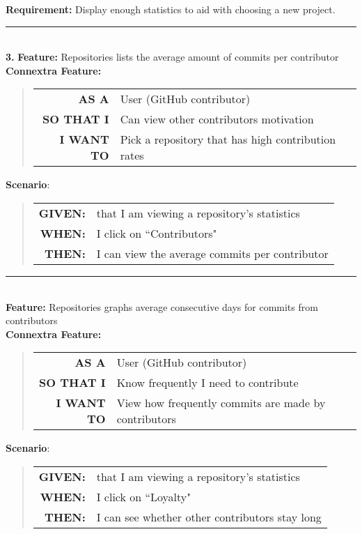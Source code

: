 \documentclass[12pt]{article}
\newcommand{\Requirement}[1] {
   \noindent \textbf{Requirement:} #1
}
\newcommand{\Feature}[1]{ 
   \noindent \textbf{Feature:} #1
}
\newcommand{\CFeature}[4]{
\noindent \textbf{Connextra Feature:}
	\begin{quote}
	\begin{tabular}{rl}
	\textbf{AS A} & #1\\
	\textbf{SO THAT \uppercase{#2}} & #3\\
	\textbf{\uppercase{#2} WANT TO} & #4  
	\end{tabular}
	\end{quote}
}
\newcommand{\GivenSc} {
	\noindent \textbf{GIVEN:}
	}
\newcommand{\WhenSc} {
	\noindent \textbf{WHEN:}
	}
\newcommand{\AndSc} {
	\noindent \textbf{AND:}
	}
\newcommand{\ThenSc} {
	\noindent \textbf{THEN:}
	}
\begin{document}
\begin{framed}
\Requirement{Display enough statistics to aid with choosing a new project.}\\[0.2cm]

\hrule~\\

\noindent  \textbf{3.}\Feature{Repositories lists the average amount of commits per contributor}\\[0.2cm]

\CFeature{User (\textsf{GitHub} contributor)}{I}{Can view other contributors motivation}{Pick a repository that has high contribution rates}

\noindent \textbf{Scenario}:
\begin{quote}
\begin{tabular}{rl}
\GivenSc & that I am viewing a repository's statistics\\
\WhenSc & I click on ``Contributors"\\
\ThenSc & I can view the average commits per contributor
\end{tabular}
\end{quote}

\hrule~\\

\Feature{Repositories graphs average consecutive days for commits from contributors}\\[0.4cm]

\CFeature{User (\textsf{GitHub} contributor)}{I}{Know frequently I need to contribute}{View how frequently commits are made by contributors}

\noindent \textbf{Scenario}:
\begin{quote}
\begin{tabular}{rl}
\GivenSc & that I am viewing a repository's statistics\\
\WhenSc & I click on ``Loyalty"\\
\ThenSc & I can see whether other contributors stay long
\end{tabular}
\end{quote}
\end{framed}
\end{document}
